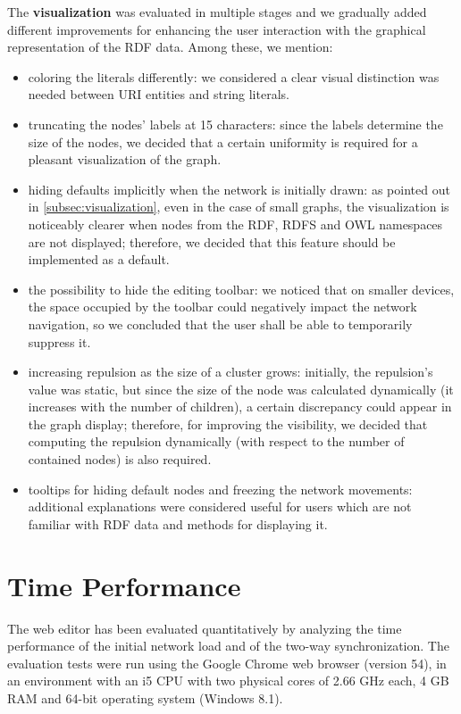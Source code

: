 The \textbf{visualization} was evaluated in multiple stages and we gradually added different improvements for enhancing the user interaction with the graphical representation of the RDF data. Among these, we mention:

\begin{itemize}
	\item coloring the literals differently: we considered a clear visual distinction was needed between URI entities and string literals.
	\item truncating the nodes' labels at 15 characters: since the labels determine the size of the nodes, we decided that a certain uniformity is required for a pleasant visualization of the graph.
	\item hiding defaults implicitly when the network is initially drawn: as pointed out in \autoref{subsec:visualization}, even in the case of small graphs, the visualization is noticeably clearer when nodes from the RDF, RDFS and OWL namespaces are not displayed; therefore, we decided that this feature should be implemented as a default.
	\item the possibility to hide the editing toolbar: we noticed that on smaller devices, the space occupied by the toolbar could negatively impact the network navigation, so we concluded that the user shall be able to temporarily suppress it.
	\item increasing repulsion as the size of a cluster grows: initially, the repulsion's value was static, but since the size of the node was calculated dynamically (it increases with the number of children), a certain discrepancy could appear in the graph display; therefore, for improving the visibility, we decided that computing the repulsion dynamically (with respect to the number of contained nodes) is also required.
	\item tooltips for hiding default nodes and freezing the network movements: additional explanations were considered useful for users which are not familiar with RDF data and methods for displaying it.
\end{itemize}


\section {Time Performance}

The web editor has been evaluated quantitatively by analyzing the time performance of the initial network load and of the two-way synchronization. The evaluation tests were run using the Google Chrome web browser (version 54), in an environment with an i5 CPU with two physical cores of 2.66 GHz each, 4 GB RAM and 64-bit operating system (Windows 8.1). 

